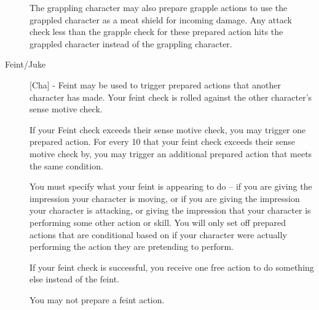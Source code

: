 \begin{description}
The grappling character may also prepare grapple actions to use the grappled character as a meat shield for incoming damage. Any attack check less than the grapple check for these prepared action hits the grappled character instead of the grappling character.
\item[Feint/Juke] [Cha] - Feint may be used to trigger prepared actions that another character has made. Your feint check is rolled against the other character’s sense motive check.

If your Feint check exceeds their sense motive check, you may trigger one prepared action. For every 10 that your feint check exceeds their sense motive check by, you may trigger an additional prepared action that meets the same condition.

You must specify what your feint is appearing to do – if you are giving the impression your character is moving, or if you are giving the impression your character is attacking, or giving the impression that your character is performing some other action or skill. You will only set off prepared actions that are conditional based on if your character were actually performing the action they are pretending to perform.

If your feint check is successful, you receive one free action to do something else instead of the feint.

You may not prepare a feint action.
\end{description}